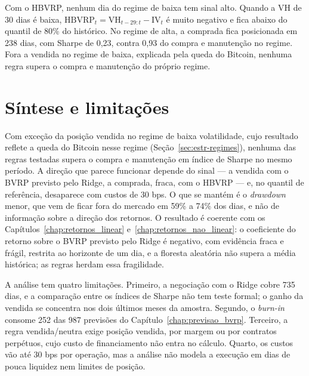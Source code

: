 Com o HBVRP, nenhum dia do regime de baixa tem sinal alto. Quando a VH de 30
dias é baixa, $\text{HBVRP}_t = \text{VH}_{t-29:t} - \text{IV}_t$
é muito negativo e fica abaixo do quantil de 80\% do histórico. No regime de
alta, a comprada fica posicionada em 238 dias, com Sharpe de 0,23, contra 0,93
do compra e manutenção no regime. Fora a vendida no regime de baixa, explicada
pela queda do Bitcoin, nenhuma regra supera o compra e manutenção do próprio
regime.

\section{Síntese e limitações}
\label{sec:estr-sintese}

Com exceção da posição vendida no regime de baixa volatilidade, cujo
resultado reflete a queda do Bitcoin nesse regime
(Seção~\ref{sec:estr-regimes}), nenhuma das regras testadas supera o compra e
manutenção em índice de Sharpe no mesmo período. A direção que parece funcionar depende do sinal --- a vendida
com o BVRP previsto pelo Ridge, a comprada, fraca, com o HBVRP --- e, no
quantil de referência, desaparece com custos de 30 bps. O que se mantém é o
\textit{drawdown} menor, que vem de ficar fora do mercado em 59\% a 74\% dos
dias, e não de informação sobre a direção dos retornos. O resultado é coerente
com os Capítulos~\ref{chap:retornos_linear} e~\ref{chap:retornos_nao_linear}:
o coeficiente do retorno sobre o BVRP previsto pelo Ridge é negativo, com
evidência fraca e frágil, restrita ao horizonte de um dia, e a floresta
aleatória não supera a média histórica; as regras herdam essa fragilidade.

A análise tem quatro limitações. Primeiro, a negociação com o Ridge cobre 735
dias, e a comparação entre os índices de Sharpe não tem teste formal; o ganho
da vendida se concentra nos dois últimos meses da amostra. Segundo, o
\textit{burn-in} consome 252 das 987 previsões do
Capítulo~\ref{chap:previsao_bvrp}. Terceiro, a regra vendida/neutra exige
posição vendida, por margem ou por contratos perpétuos, cujo custo de
financiamento não entra no cálculo. Quarto, os custos vão até 30 bps por
operação, mas a análise não modela a execução em dias de pouca liquidez nem
limites de posição.
